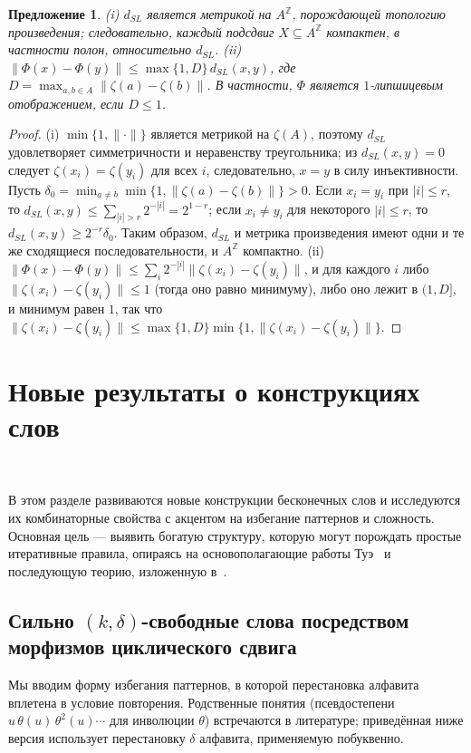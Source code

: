 \documentclass[a4paper,14pt]{extreport}
\theoremstyle{plain}
\newtheorem{proposition}[theorem]{Предложение}
\theoremstyle{definition}
\theoremstyle{remark}
\begin{document}
\begin{proposition}\label{propositionn1}
	(i) $d_{SL}$ является метрикой на $A^{\mathbb Z}$, порождающей топологию произведения; следовательно, каждый подсдвиг $X\subseteq A^{\mathbb Z}$ компактен, в частности полон, относительно $d_{SL}$.
	(ii) $\|\Phi(x)-\Phi(y)\|\le\max\{1,D\}\,d_{SL}(x,y)$, где $D=\max_{a,b\in A}\|\zeta(a)-\zeta(b)\|$. В частности, $\Phi$ является $1$-липшицевым отображением, если $D\le1$.
\end{proposition}
\begin{proof}
	(i) $\min\{1,\|\cdot\|\}$ является метрикой на $\zeta(A)$, поэтому $d_{SL}$ удовлетворяет симметричности и неравенству треугольника; из $d_{SL}(x,y)=0$ следует $\zeta(x_i)=\zeta(y_i)$ для всех $i$, следовательно, $x=y$ в силу инъективности.
	Пусть $\delta_0=\min_{a\ne b}\min\{1,\|\zeta(a)-\zeta(b)\|\}>0$. Если $x_i=y_i$ при $|i|\le r$, то $d_{SL}(x,y)\le\sum_{|i|>r}2^{-|i|}=2^{1-r}$;
	если $x_i\ne y_i$ для некоторого $|i|\le r$, то $d_{SL}(x,y)\ge2^{-r}\delta_0$. Таким образом, $d_{SL}$ и метрика произведения имеют одни и те же сходящиеся последовательности, и $A^{\mathbb Z}$ компактно.
	(ii) $\|\Phi(x)-\Phi(y)\|\le\sum_i2^{-|i|}\|\zeta(x_i)-\zeta(y_i)\|$, и для каждого $i$ либо $\|\zeta(x_i)-\zeta(y_i)\|\le1$ (тогда оно равно минимуму), либо оно лежит в $(1,D]$, и минимум равен $1$,
	так что $\|\zeta(x_i)-\zeta(y_i)\|\le\max\{1,D\}\min\{1,\|\zeta(x_i)-\zeta(y_i)\|\}$.
\end{proof}	
\section{Новые результаты о конструкциях слов}~\label{sec3.8}

В этом разделе развиваются новые конструкции бесконечных слов и исследуются их комбинаторные свойства с акцентом на избегание паттернов и сложность. Основная цель --- выявить богатую структуру, которую могут порождать простые итеративные правила, опираясь на основополагающие работы 
Туэ~\cite{Thue} и последующую теорию, изложенную в~\cite{Lothaire2002, Allouche}.    
\subsection{Сильно \texorpdfstring{$(k,\delta)$}{(k,delta)}-свободные слова посредством морфизмов циклического сдвига}

Мы вводим форму избегания паттернов, в которой перестановка алфавита вплетена в условие повторения.
Родственные понятия (псевдостепени $u\,\theta(u)\,\theta^2(u)\cdots$ для инволюции $\theta$) встречаются в литературе; приведённая ниже версия использует
перестановку $\delta$ алфавита, применяемую побуквенно.
\end{document}
